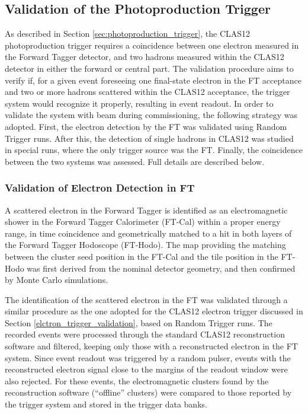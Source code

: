 \subsection{Validation of the Photoproduction Trigger}

As described in Section \ref{sec:photoproduction_trigger}, the CLAS12 photoproduction trigger requires a coincidence between one electron measured in the Forward Tagger detector, and two hadrons measured within the CLAS12 detector in either the forward or central part. The validation procedure aims to verify if, for a given event foreseeing one final-state electron in the FT acceptance and two or more hadrons scattered within the CLAS12 acceptance, the trigger system would recognize it properly, resulting in event readout. In order to validate the system with beam during commissioning, the following strategy was adopted. First, the electron detection by the FT was validated using Random Trigger runs. After this, the detection of single hadrons in CLAS12 was studied in special runs, where the only trigger source was the FT. Finally, the coincidence between the two systems was assessed. Full details are described below.

\subsubsection{Validation of Electron Detection in FT}

A scattered electron in the Forward Tagger is identified as an electromagnetic shower in the Forward Tagger Calorimeter (FT-Cal) within a proper energy range, in time coincidence and geometrically matched to a hit in both layers of the Forward Tagger Hodoscope (FT-Hodo). The map providing the matching between the cluster seed position in the FT-Cal and the tile position in the FT-Hodo was first derived from the nominal detector geometry, and then confirmed by Monte Carlo simulations.

The identification of the scattered electron in the FT was validated through a similar procedure as the one adopted for the CLAS12 electron trigger discussed in Section \ref{elctron_trigger_validation}, based on Random Trigger runs. The recorded events were processed through the standard CLAS12 reconstruction software and filtered, keeping only those with a reconstructed electron in the FT system. Since event readout was triggered by a random pulser, events with the reconstructed electron signal close to the margins of the readout window were also rejected. For these events, the electromagnetic clusters found by the reconstruction software (``offline'' clusters) were compared to those reported by the trigger system and stored in the trigger data banks.

